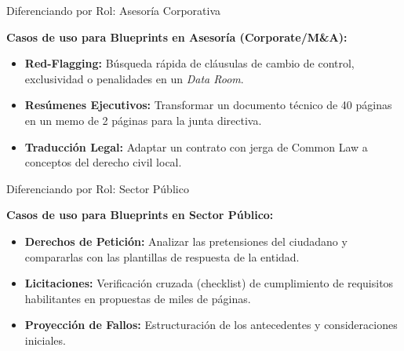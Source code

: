 \documentclass[aspectratio=169]{beamer}
\begin{document}
\begin{frame}{Diferenciando por Rol: Asesoría Corporativa}

\textbf{Casos de uso para Blueprints en Asesoría (Corporate/M\&A):}
\begin{itemize}
  \item \textbf{Red-Flagging:} Búsqueda rápida de cláusulas de cambio de control, exclusividad o penalidades en un \textit{Data Room}.
  \item \textbf{Resúmenes Ejecutivos:} Transformar un documento técnico de 40 páginas en un memo de 2 páginas para la junta directiva.
  \item \textbf{Traducción Legal:} Adaptar un contrato con jerga de Common Law a conceptos del derecho civil local.
\end{itemize}
\end{frame}

\begin{frame}{Diferenciando por Rol: Sector Público}

\textbf{Casos de uso para Blueprints en Sector Público:}
\begin{itemize}
  \item \textbf{Derechos de Petición:} Analizar las pretensiones del ciudadano y compararlas con las plantillas de respuesta de la entidad.
  \item \textbf{Licitaciones:} Verificación cruzada (checklist) de cumplimiento de requisitos habilitantes en propuestas de miles de páginas.
  \item \textbf{Proyección de Fallos:} Estructuración de los antecedentes y consideraciones iniciales.
\end{itemize}
\end{frame}

\end{document}

